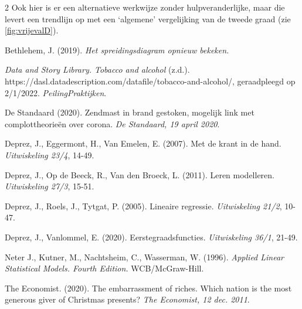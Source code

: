\begin{multicols}{2}
Ook hier is er een alternatieve werkwijze zonder hulpveranderlijke, maar die levert een trendlijn op met een `algemene' vergelijking van de tweede graad (zie \autoref{fig:vrijevalD}).





\end{multicols}

\newpage
\begin{bronnen}
  
    \item Bethlehem, J. (2019). \textit{Het spreidingsdiagram opnieuw bekeken.} 
    \item \emph{Data and Story Library. Tobacco and alcohol} (z.d.).  https://dasl.datadescription.com/datafile/tobacco-and-alcohol/, geraadpleegd op 2/1/2022. \textit{PeilingPraktijken}.
    \item De Standaard (2020). Zendmast in brand gestoken, mogelijk link met complottheorieën over corona. \textit{De Standaard, 19 april 2020}.
    \item Deprez, J., Eggermont, H., Van Emelen, E. (2007). Met de krant in de hand. \emph{Uitwiskeling 23/4}, 14-49.
    \item Deprez, J., Op de Beeck, R., Van den Broeck, L. (2011). Leren modelleren. \emph{Uitwiskeling 27/3}, 15-51.
    \item Deprez, J., Roels, J., Tytgat, P. (2005). Lineaire regressie. \emph{Uitwiskeling 21/2}, 10-47.
    \item Deprez, J., Vanlommel, E. (2020). Eerstegraadsfuncties. \emph{Uitwiskeling 36/1}, 21-49.
    \item Neter J., Kutner, M., Nachtsheim, C., Wasserman, W. (1996). \textit{Applied Linear Statistical Models. Fourth Edition.} WCB/McGraw-Hill.
    \item The Economist. (2020). The embarrassment of riches.  Which nation is the most generous giver of Christmas presents? \emph{The Economist, 12 dec. 2011}.
    

\end{bronnen}
\vspace{3 cm}

